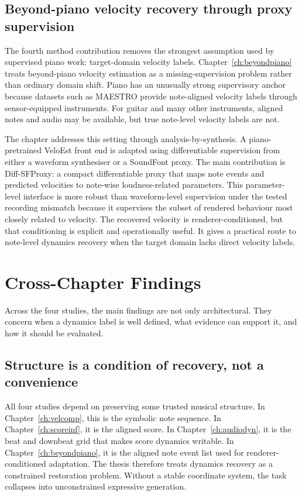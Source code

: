 \subsection{Beyond-piano velocity recovery through proxy supervision}
\label{ssec:conclusion:ch6}

The fourth method contribution removes the strongest assumption used by supervised piano work: target-domain velocity labels. Chapter~\ref{ch:beyondpiano} treats beyond-piano velocity estimation as a missing-supervision problem rather than ordinary domain shift. Piano has an unusually strong supervisory anchor because datasets such as MAESTRO provide note-aligned velocity labels through sensor-equipped instruments. For guitar and many other instruments, aligned notes and audio may be available, but true note-level velocity labels are not.

The chapter addresses this setting through analysis-by-synthesis. A piano-pretrained VeloEst front end is adapted using differentiable supervision from either a waveform synthesiser or a SoundFont proxy. The main contribution is Diff-SFProxy: a compact differentiable proxy that maps note events and predicted velocities to note-wise loudness-related parameters. This parameter-level interface is more robust than waveform-level supervision under the tested recording mismatch because it supervises the subset of rendered behaviour most closely related to velocity. The recovered velocity is renderer-conditioned, but that conditioning is explicit and operationally useful. It gives a practical route to note-level dynamics recovery when the target domain lacks direct velocity labels.

\section{Cross-Chapter Findings}
\label{sec:conclusion:findings}

Across the four studies, the main findings are not only architectural. They concern when a dynamics label is well defined, what evidence can support it, and how it should be evaluated.

\subsection{Structure is a condition of recovery, not a convenience}
\label{ssec:conclusion:structure}

All four studies depend on preserving some trusted musical structure. In Chapter~\ref{ch:velcomp}, this is the symbolic note sequence. In Chapter~\ref{ch:scoreinf}, it is the aligned score. In Chapter~\ref{ch:audiodyn}, it is the beat and downbeat grid that makes score dynamics writable. In Chapter~\ref{ch:beyondpiano}, it is the aligned note event list used for renderer-conditioned adaptation. The thesis therefore treats dynamics recovery as a constrained restoration problem. Without a stable coordinate system, the task collapses into unconstrained expressive generation.

